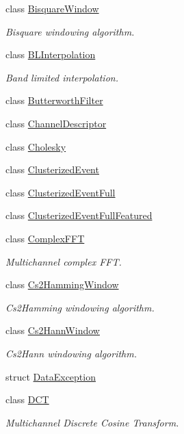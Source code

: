 \begin{DoxyCompactItemize}
class \hyperlink{classtsa_1_1_bisquare_window}{Bisquare\+Window}
\begin{DoxyCompactList}\small\item\em Bisquare windowing algorithm. \end{DoxyCompactList}\item 
class \hyperlink{classtsa_1_1_b_l_interpolation}{B\+L\+Interpolation}
\begin{DoxyCompactList}\small\item\em Band limited interpolation. \end{DoxyCompactList}\item 
class \hyperlink{classtsa_1_1_butterworth_filter}{Butterworth\+Filter}
\item 
class \hyperlink{classtsa_1_1_channel_descriptor}{Channel\+Descriptor}
\item 
class \hyperlink{classtsa_1_1_cholesky}{Cholesky}
\item 
class \hyperlink{classtsa_1_1_clusterized_event}{Clusterized\+Event}
\item 
class \hyperlink{classtsa_1_1_clusterized_event_full}{Clusterized\+Event\+Full}
\item 
class \hyperlink{classtsa_1_1_clusterized_event_full_featured}{Clusterized\+Event\+Full\+Featured}
\item 
class \hyperlink{classtsa_1_1_complex_f_f_t}{Complex\+F\+FT}
\begin{DoxyCompactList}\small\item\em Multichannel complex F\+FT. \end{DoxyCompactList}\item 
class \hyperlink{classtsa_1_1_cs2_hamming_window}{Cs2\+Hamming\+Window}
\begin{DoxyCompactList}\small\item\em Cs2\+Hamming windowing algorithm. \end{DoxyCompactList}\item 
class \hyperlink{classtsa_1_1_cs2_hann_window}{Cs2\+Hann\+Window}
\begin{DoxyCompactList}\small\item\em Cs2\+Hann windowing algorithm. \end{DoxyCompactList}\item 
struct \hyperlink{structtsa_1_1_data_exception}{Data\+Exception}
\item 
class \hyperlink{classtsa_1_1_d_c_t}{D\+CT}
\begin{DoxyCompactList}\small\item\em Multichannel Discrete Cosine Transform. \end{DoxyCompactList}\item 

\end{DoxyCompactItemize}
